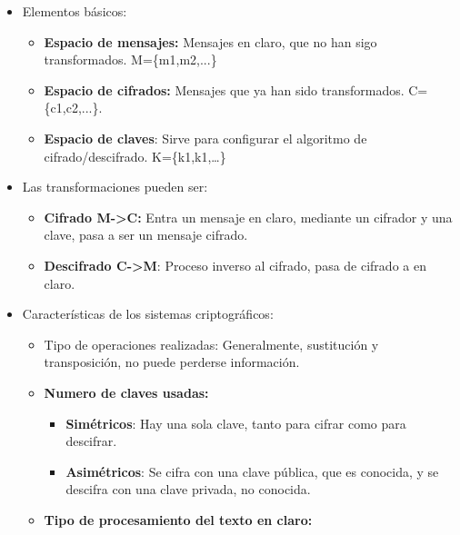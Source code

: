 \documentclass[12pt, twoside, openright]{report} %
\begin{document}
  \begin{itemize}
  \item Elementos básicos:
    
    \begin{itemize}
    \item \textbf{Espacio de mensajes:} Mensajes en claro, que no han sigo
      transformados. M=\{m1,m2,...\}
      
    \item \textbf{Espacio de cifrados:} Mensajes que ya han sido
      transformados. C=\{c1,c2,...\}.
      
    \item \textbf{Espacio de claves}: Sirve para configurar el algoritmo de
      cifrado/descifrado. K=\{k1,k1,\ldots\}
      
    \end{itemize}
  \item Las transformaciones pueden ser:
        \begin{itemize}
    \item \textbf{Cifrado M-\textgreater C:} Entra un mensaje en claro,
      mediante un cifrador y una clave, pasa a ser un mensaje cifrado.
      
    \item \textbf{Descifrado C-\textgreater M}: Proceso inverso al cifrado,
      pasa de cifrado a en claro.
      
    \end{itemize}
  \item Características de los sistemas criptográficos:
        \begin{itemize}
    \item Tipo de operaciones realizadas: Generalmente, sustitución y
      transposición, no puede perderse información.
      
    \item \textbf{Numero de claves usadas:}
      
      \begin{itemize}
      \item \textbf{Simétricos}: Hay una sola clave, tanto para cifrar como
        para descifrar.
        
      \item \textbf{Asimétricos}: Se cifra con una clave pública, que es
        conocida, y se descifra con una clave privada, no conocida.
        
      \end{itemize}
    \item \textbf{Tipo de procesamiento del texto en claro:}
      

\end{itemize}
\end{itemize}
\end{document}
